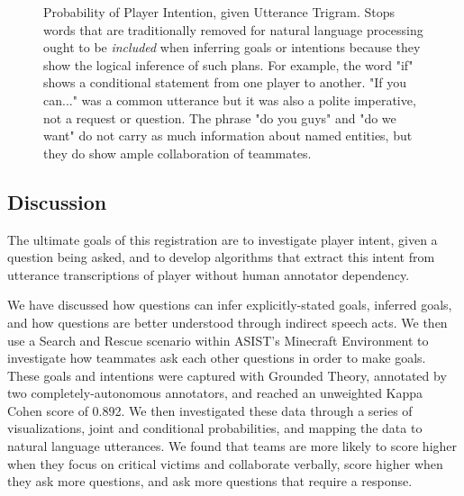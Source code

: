 \begin{figure}[h!]
    \centering    
    \caption{Probability of Player Intention, given Utterance Trigram. Stops words that are traditionally removed for natural language processing ought to be \emph{included} when inferring goals or intentions because they show the logical inference of such plans. For example, the word "if" shows a conditional statement from one player to another. "If you can..." was a common utterance but it was also a polite imperative, not a request or question. The phrase "do you guys" and "do we want" do not carry as much information about named entities, but they do show ample collaboration of teammates.}
\end{figure}


\clearpage
\newpage


\subsection{Discussion}

The ultimate goals of this registration are to investigate player intent, given a question being asked, and 
to develop algorithms that extract this
intent from utterance transcriptions of player without human annotator
dependency. 

We have discussed how questions can infer explicitly-stated goals, inferred goals, and how questions are better understood through indirect speech acts. We then use a Search and Rescue scenario within ASIST's Minecraft Environment to investigate how teammates ask each other questions in order to make goals. These goals and intentions were captured with Grounded Theory, annotated by two completely-autonomous annotators, and reached an unweighted Kappa Cohen score of 0.892. We then investigated these data through a series of visualizations, joint and conditional probabilities, and mapping the data to natural language utterances. We found that teams are more likely to score higher when they focus on critical victims and collaborate verbally, score higher when they ask more questions, and ask more questions that require a response.

